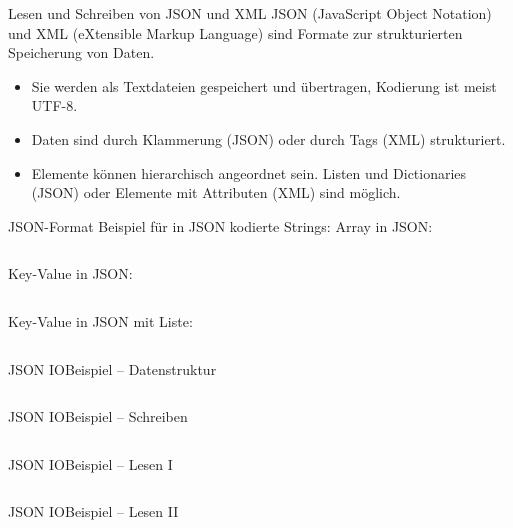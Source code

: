 \documentclass[xelatex,aspectratio=169]{beamer}
\begin{document}
\begin{frame}{Lesen und Schreiben von JSON und XML}
    JSON (JavaScript Object Notation) und XML (eXtensible Markup Language) sind Formate zur strukturierten Speicherung von Daten.

    \begin{itemize}
        \item Sie werden als Textdateien gespeichert und übertragen, Kodierung ist meist UTF-8.
        \item Daten sind durch Klammerung (JSON) oder durch Tags (XML) strukturiert.
        \item Elemente können hierarchisch angeordnet sein. Listen und Dictionaries (JSON) oder Elemente mit Attributen (XML) sind möglich.
    \end{itemize}
\end{frame}

\begin{frame}{JSON-Format}
    Beispiel für in JSON kodierte Strings:
    Array in JSON:
    \inputminted{JSON}{src/io_json_example1.json}

    Key-Value in JSON:
    \inputminted{JSON}{src/io_json_example2.json}

    Key-Value in JSON mit Liste:
    \inputminted{JSON}{src/io_json_example3.json}

\end{frame}

\begin{frame}{JSON IO}{Beispiel -- Datenstruktur}
    \inputminted[firstline=1,lastline=14]{python}{src/io_json_io.py}
\end{frame}
\begin{frame}{JSON IO}{Beispiel -- Schreiben}
    \small
    \inputminted[firstline=19,lastline=34]{python}{src/io_json_io.py}
\end{frame}
\begin{frame}{JSON IO}{Beispiel -- Lesen I}
    \small
    \inputminted[firstline=35,lastline=49]{python}{src/io_json_io.py}
\end{frame}
\begin{frame}{JSON IO}{Beispiel -- Lesen II}
    \small
    \inputminted[firstline=51,lastline=58]{python}{src/io_json_io.py}
\end{frame}
\end{document}
